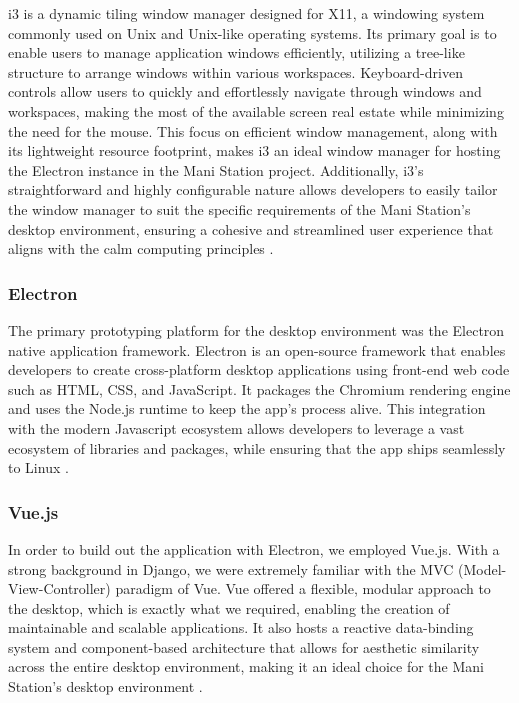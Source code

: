 \documentclass[letterpaper,twocolumn,10pt]{article}
\begin{document}
i3 is a dynamic tiling window manager designed for X11, a windowing system commonly used on Unix and Unix-like operating systems. Its primary goal is to enable users to manage application windows efficiently, utilizing a tree-like structure to arrange windows within various workspaces. Keyboard-driven controls allow users to quickly and effortlessly navigate through windows and workspaces, making the most of the available screen real estate while minimizing the need for the mouse. This focus on efficient window management, along with its lightweight resource footprint, makes i3 an ideal window manager for hosting the Electron instance in the Mani Station project. Additionally, i3's straightforward and highly configurable nature allows developers to easily tailor the window manager to suit the specific requirements of the Mani Station's desktop environment, ensuring a cohesive and streamlined user experience that aligns with the calm computing principles \cite{i3-guide}.

\subsubsection{Electron}
The primary prototyping platform for the desktop environment was the Electron native application framework. Electron is an open-source framework that enables developers to create cross-platform desktop applications using front-end web code such as HTML, CSS, and JavaScript. It packages the Chromium rendering engine and uses the Node.js runtime to keep the app’s process alive. This integration with the modern Javascript ecosystem allows developers to leverage a vast ecosystem of libraries and packages, while ensuring that the app ships seamlessly to Linux \cite{electron-docs}.

\subsubsection{Vue.js}

In order to build out the application with Electron, we employed Vue.js. With a strong background in Django, we were extremely familiar with the MVC (Model-View-Controller) paradigm of Vue. Vue offered a flexible, modular approach to the desktop, which is exactly what we required, enabling the creation of maintainable and scalable applications. It also hosts a reactive data-binding system and component-based architecture that allows for aesthetic similarity across the entire desktop environment, making it an ideal choice for the Mani Station's desktop environment \cite{vuejs}.
\end{document}
